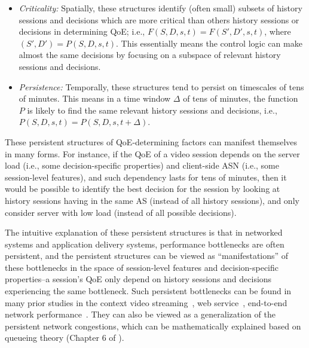 \begin{itemize}

\item {\em Criticality:} Spatially, these structures identify (often small) 
subsets of history
sessions and decisions which are more critical than others history sessions 
or decisions in determining QoE; i.e.,
$F(S,D,s,t)=F(S',D',s,t)$, where $(S',D')=P(S,D,s,t)$. This essentially
means the \ddn control logic can make almost the same decisions by
focusing on a subspace of relevant history sessions and decisions.

\item {\em Persistence:} Temporally, these structures tend to persist
on timescales of tens of minutes. This means in a time window $\Delta$ 
of  tens of minutes, the function $P$ is likely 
to find the same relevant history sessions and decisions,
i.e., $P(S,D,s,t)=P(S,D,s,t+\Delta)$.

\end{itemize}


These persistent structures of QoE-determining factors can 
manifest themselves in many forms.
For instance, if the QoE of a video session depends on
the server load (i.e., some decision-specific properties)
and client-side ASN (i.e., some session-level features), and such
dependency lasts for tens of minutes,
then it would be possible to identify the best decision for
the session by looking
at history sessions having in the same AS 
(instead of all history sessions), and only consider server with 
low load (instead of all possible decisions).

The intuitive explanation of these persistent structures 
is that in networked systems and application delivery  systems, performance
bottlenecks are often persistent, and the persistent structures
can be viewed as ``manifestations'' of these bottlenecks in the space of 
session-level features and decision-specific properties--a session's QoE
only depend on history sessions and decisions 
experiencing the same bottleneck.
Such persistent bottlenecks can be found in many prior studies in the context
video streaming~\cite{cfa}, 
web service~\cite{footprint}, end-to-end
network performance~\cite{zhang2001constancy}.
They can also be viewed as a generalization of the persistent 
network congestions, which can be mathematically explained based on queueing theory
(Chapter 6 of \cite{keshav2012mathematical}).


